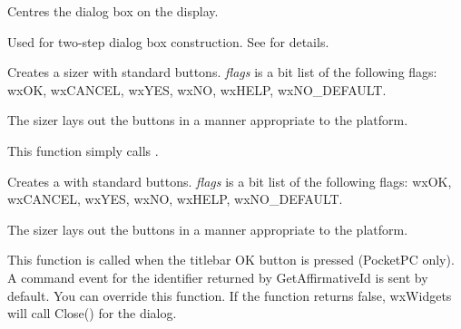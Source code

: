 Centres the dialog box on the display.




\label{wxdialogcreate}


Used for two-step dialog box construction. See \rtfsp
for details.


\label{wxdialogcreatebuttonsizer}


Creates a sizer with standard buttons. {\it flags} is a bit list
of the following flags: wxOK, wxCANCEL, wxYES, wxNO, wxHELP, wxNO\_DEFAULT.

The sizer lays out the buttons in a manner appropriate to the platform.

This function simply calls .


\label{wxdialogcreatestddialogbuttonsizer}


Creates a  with standard buttons. {\it flags} is a bit list
of the following flags: wxOK, wxCANCEL, wxYES, wxNO, wxHELP, wxNO\_DEFAULT.

The sizer lays out the buttons in a manner appropriate to the platform.


\label{wxdialogdook}


This function is called when the titlebar OK button is pressed (PocketPC only).
A command event for the identifier returned by GetAffirmativeId is sent by
default. You can override this function. If the function returns false, wxWidgets
will call Close() for the dialog.


